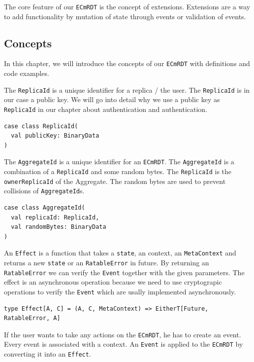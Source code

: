 \documentclass[
	ngerman,
	ruledheaders=section,   %
	class=report,		    %
	thesis={type=bachelor}, %
	accentcolor=9c,			%
	custommargins=false,    %
	marginpar=false,        %
	parskip=half-,          %
	fontsize=11pt,          %
]{tudapub}
\let\code\texttt
\begin{document}
The core feature of our \code{ECmRDT} is the concept of extensions. Extensions are a way to add functionality by mutation of state through events or validation of events. 

\subsection{Concepts}

In this chapter, we will introduce the concepts of our \code{ECmRDT} with definitions and code examples.

The \code{ReplicaId} is a unique identifier for a replica / the user. The \code{ReplicaId} is in our case a public key. We will go into detail why we use a public key as \code{ReplicaId} in our chapter about authentication and authentication.

\begin{lstlisting}
case class ReplicaId(
  val publicKey: BinaryData
)
\end{lstlisting}

The \code{AggregateId} is a unique identifier for an \code{ECmRDT}. The \code{AggregateId} is a combination of a \code{ReplicaId} and some random bytes. The \code{ReplicaId} is the \code{ownerReplicaId} of the Aggregate. The random bytes are used to prevent collisions of \code{AggregateId}s.

\begin{lstlisting}
case class AggregateId(
  val replicaId: ReplicaId,
  val randomBytes: BinaryData
)
\end{lstlisting}

An \code{Effect} is a function that takes a \code{state}, an context, an \code{MetaContext} and returns a new \code{state} or an \code{RatableError} in future. By returning an \code{RatableError} we can verify the \code{Event} together with the given parameters. The effect is an asynchronous operation because we need to use cryptograpic operations to verify the \code{Event} which are usally implemented asynchronously.

\begin{lstlisting}
type Effect[A, C] = (A, C, MetaContext) => EitherT[Future, RatableError, A]
\end{lstlisting}

If the user wants to take any actions on the \code{ECmRDT}, he has to create an event. Every event is associated with a context. An \code{Event} is applied to the \code{ECmRDT} by converting it into an \code{Effect}.
\end{document}

